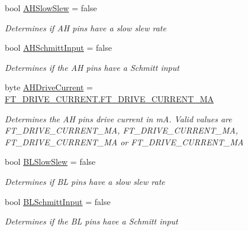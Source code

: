 \begin{DoxyCompactItemize}
bool \mbox{\hyperlink{class_f_t_d2_x_x___n_e_t_1_1_f_t_d_i_1_1_f_t2232_h___e_e_p_r_o_m___s_t_r_u_c_t_u_r_e_a945739c2ab2889a1a7016127919c2791}{A\+H\+Slow\+Slew}} = false
\begin{DoxyCompactList}\small\item\em Determines if AH pins have a slow slew rate \end{DoxyCompactList}\item 
bool \mbox{\hyperlink{class_f_t_d2_x_x___n_e_t_1_1_f_t_d_i_1_1_f_t2232_h___e_e_p_r_o_m___s_t_r_u_c_t_u_r_e_ac7949872ecf5a64e0f87f1b54e2a09a8}{A\+H\+Schmitt\+Input}} = false
\begin{DoxyCompactList}\small\item\em Determines if the AH pins have a Schmitt input \end{DoxyCompactList}\item 
byte \mbox{\hyperlink{class_f_t_d2_x_x___n_e_t_1_1_f_t_d_i_1_1_f_t2232_h___e_e_p_r_o_m___s_t_r_u_c_t_u_r_e_ae792c46338485d31a66a6d46a5a9fb1f}{A\+H\+Drive\+Current}} = \mbox{\hyperlink{class_f_t_d2_x_x___n_e_t_1_1_f_t_d_i_1_1_f_t___d_r_i_v_e___c_u_r_r_e_n_t_af6b404bcc6f2eb88bbc95b183d5729ea}{F\+T\+\_\+\+D\+R\+I\+V\+E\+\_\+\+C\+U\+R\+R\+E\+N\+T.\+F\+T\+\_\+\+D\+R\+I\+V\+E\+\_\+\+C\+U\+R\+R\+E\+N\+T\+\_\+MA}}
\begin{DoxyCompactList}\small\item\em Determines the AH pins drive current in mA. Valid values are F\+T\+\_\+\+D\+R\+I\+V\+E\+\_\+\+C\+U\+R\+R\+E\+N\+T\+\_\+MA, F\+T\+\_\+\+D\+R\+I\+V\+E\+\_\+\+C\+U\+R\+R\+E\+N\+T\+\_\+MA, F\+T\+\_\+\+D\+R\+I\+V\+E\+\_\+\+C\+U\+R\+R\+E\+N\+T\+\_\+MA or F\+T\+\_\+\+D\+R\+I\+V\+E\+\_\+\+C\+U\+R\+R\+E\+N\+T\+\_\+MA \end{DoxyCompactList}\item 
bool \mbox{\hyperlink{class_f_t_d2_x_x___n_e_t_1_1_f_t_d_i_1_1_f_t2232_h___e_e_p_r_o_m___s_t_r_u_c_t_u_r_e_a1d814bbc9ef7208fc515532c09ddc74d}{B\+L\+Slow\+Slew}} = false
\begin{DoxyCompactList}\small\item\em Determines if BL pins have a slow slew rate \end{DoxyCompactList}\item 
bool \mbox{\hyperlink{class_f_t_d2_x_x___n_e_t_1_1_f_t_d_i_1_1_f_t2232_h___e_e_p_r_o_m___s_t_r_u_c_t_u_r_e_ac73a532db176b53a8e78be7fe3809525}{B\+L\+Schmitt\+Input}} = false
\begin{DoxyCompactList}\small\item\em Determines if the BL pins have a Schmitt input \end{DoxyCompactList}\item 

\end{DoxyCompactItemize}
